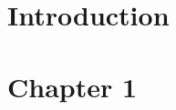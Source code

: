 \documentclass[11pt,openright,oneside,letterpaper,onecolumn]{report}  %
\begin{document}
\pagestyle{empty}

\thesistitlepage
\thesiscopyrightpage

\thesisabstract


\pagestyle{plain}

\setlength{\footskip}{0.5in}

\setcounter{tocdepth}{2}
\renewcommand{\contentsname}{Table of Contents}
\tableofcontents
\cleardoublepage                         

\listoffigures
\cleardoublepage

\listoftables 
\cleardoublepage


\cleardoublepage



\pagestyle{headings}

%
%
\setlength{\textheight}{8.5in}
\setlength{\footskip}{0in}
\baselineskip=26pt

 {%
\fancyhf{}
\fancyhead[LE,RO]{\thepage}
\fancyhead[RE,LO]{\itshape \leftmark}
\renewcommand{\headrulewidth}{0pt}
}
\pagestyle{plain}

\chapter{Introduction}
\label{section:intro}



\chapter{Chapter 1}
\label{chapter1}

\end{document}
